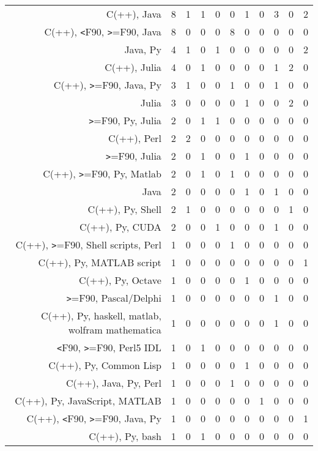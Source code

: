 {\begin{landscape}
\begin{longtable}[htb]{r|c|c|c|c|c|c|c|c|c|c}
{C(++), Java} & 8 & 1 & 1 & 0 & 0 & 1 & 0 & 3 & 0 & 2 \\%
{C(++), \verb!<!F90, \verb!>!=F90, Java} & 8 & 0 & 0 & 0 & 8 & 0 & 0 & 0 & 0 & 0 \\%
{Java, Py} & 4 & 1 & 0 & 1 & 0 & 0 & 0 & 0 & 0 & 2 \\%
{C(++), Julia} & 4 & 0 & 1 & 0 & 0 & 0 & 0 & 1 & 2 & 0 \\%
{C(++), \verb!>!=F90, Java, Py} & 3 & 1 & 0 & 0 & 1 & 0 & 0 & 1 & 0 & 0 \\%
{Julia} & 3 & 0 & 0 & 0 & 0 & 1 & 0 & 0 & 2 & 0 \\%
{\verb!>!=F90, Py, Julia} & 2 & 0 & 1 & 1 & 0 & 0 & 0 & 0 & 0 & 0 \\%
{C(++), Perl} & 2 & 2 & 0 & 0 & 0 & 0 & 0 & 0 & 0 & 0 \\%
{\verb!>!=F90, Julia} & 2 & 0 & 1 & 0 & 0 & 1 & 0 & 0 & 0 & 0 \\%
{C(++), \verb!>!=F90, Py, Matlab} & 2 & 0 & 1 & 0 & 1 & 0 & 0 & 0 & 0 & 0 \\%
{Java} & 2 & 0 & 0 & 0 & 0 & 1 & 0 & 1 & 0 & 0 \\%
{C(++), Py, Shell} & 2 & 1 & 0 & 0 & 0 & 0 & 0 & 0 & 1 & 0 \\%
{C(++), Py, CUDA} & 2 & 0 & 0 & 1 & 0 & 0 & 0 & 1 & 0 & 0 \\%
{C(++), \verb!>!=F90, Shell scripts, Perl} & 1 & 0 & 0 & 0 & 1 & 0 & 0 & 0 & 0 & 0 \\%
{C(++), Py, MATLAB script} & 1 & 0 & 0 & 0 & 0 & 0 & 0 & 0 & 0 & 1 \\%
{C(++), Py, Octave} & 1 & 0 & 0 & 0 & 0 & 1 & 0 & 0 & 0 & 0 \\%
{\verb!>!=F90, Pascal/Delphi} & 1 & 0 & 0 & 0 & 0 & 0 & 0 & 1 & 0 & 0 \\%
{C(++), Py, haskell, matlab, wolfram mathematica} & 1 & 0 & 0 & 0 & 0 & 0 & 0 & 1 & 0 & 0 \\%
{\verb!<!F90, \verb!>!=F90, Perl5 IDL} & 1 & 0 & 1 & 0 & 0 & 0 & 0 & 0 & 0 & 0 \\%
{C(++), Py, Common Lisp} & 1 & 0 & 0 & 0 & 0 & 1 & 0 & 0 & 0 & 0 \\%
{C(++), Java, Py, Perl} & 1 & 0 & 0 & 0 & 1 & 0 & 0 & 0 & 0 & 0 \\%
{C(++), Py, JavaScript, MATLAB} & 1 & 0 & 0 & 0 & 0 & 0 & 1 & 0 & 0 & 0 \\%
{C(++), \verb!<!F90, \verb!>!=F90, Java, Py} & 1 & 0 & 0 & 0 & 0 & 0 & 0 & 0 & 0 & 1 \\%
{C(++), Py, bash} & 1 & 0 & 1 & 0 & 0 & 0 & 0 & 0 & 0 & 0 \\%

\end{longtable}
\end{landscape}}
